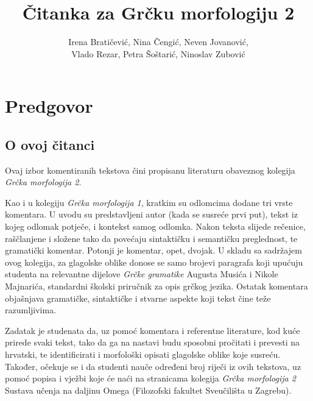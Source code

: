 \documentclass[a4paper,12pt,twoside]{report}
\newcommand{\subtitle}[1]{%
  \posttitle{%
    \par\end{center}
    \begin{center}\large#1\end{center}
    \vskip0.5em}%
}
\begin{document}
\title{Čitanka za Grčku morfologiju 2}
\author{Irena Bratičević, Nina Čengić, Neven Jovanović,\\Vlado Rezar, Petra Šoštarić, Ninoslav Zubović}
\date{}
\maketitle

\clearpage

\tableofcontents

\thispagestyle{empty}




\chapter*{Predgovor}

\section*{O ovoj čitanci}
\label{chap:predgovor}

Ovaj izbor komentiranih tekstova čini propisanu literaturu obaveznog kolegija \textit{Grčka morfologija 2}.

Kao i u kolegiju \textit{Grčka morfologija 1}, kratkim su odlomcima dodane tri vrste komentara. U uvodu su predstavljeni autor (kada se susreće prvi put), tekst iz kojeg odlomak potječe, i kontekst samog odlomka. Nakon teksta slijede rečenice, raščlanjene i složene tako da povećaju sintaktičku i semantičku preglednost, te gramatički komentar. Potonji je komentar, opet, dvojak. U skladu sa sadržajem ovog kolegija, za glagolske oblike donose se samo brojevi paragrafa koji upućuju studenta na relevantne dijelove \textit{Grčke gramatike} Augusta Musića i Nikole Majnarića, standardni školski priručnik za opis grčkog jezika. Ostatak komentara objašnjava gramatičke, sintaktičke i stvarne aspekte koji tekst čine teže razumljivima.

Zadatak je studenata da, uz pomoć komentara i referentne literature, kod kuće prirede svaki tekst, tako da ga na nastavi budu sposobni pročitati i prevesti na hrvatski, te identificirati i morfološki opisati glagolske oblike koje susreću. Također, očekuje se i da studenti nauče određeni broj riječi iz ovih tekstova, uz pomoć popisa i vježbi koje će naći na stranicama kolegija \textit{Grčka morfologija 2} Sustava učenja na daljinu Omega (Filozofski fakultet Sveučilišta u Zagrebu).

\newpage
\end{document}
